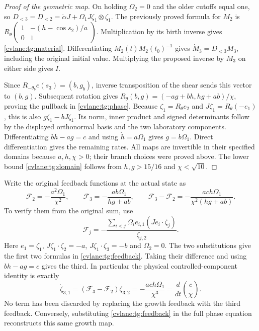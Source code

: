 \begin{proof}[Proof of the geometric map]
On holding $\Omega_2=0$ and the older cutoffs equal one, so
$D_{<3}=D_{<2}=\dot\alpha J+
\Omega_1J\zeta_1\otimes\zeta_1$.
The previously proved formula for $M_2$ is
$R_\theta\left(\begin{smallmatrix}1&-(h-\cos s_2)/a\\0&1\end{smallmatrix}\right)$.
Multiplication by its birth inverse gives \eqref{cvlane:tg:material}.
Differentiating $M_2(t)M_2(t_0)^{-1}$ gives
$\dot M_3=D_{<3}M_3$, including the original initial value.
Multiplying the proposed inverse by $M_3$ on either side gives $I$.

Since $R_{-\theta_b}e(s_3)=(b,g_b)$, inverse transposition
of the shear sends this vector to $(b,g)$. Subsequent rotation gives
$R_\theta(b,g)=(-ag+bh,hg+ab)/\chi$, proving the pullback in
\eqref{cvlane:tg:phase}. Because $\zeta_1=R_\theta e_2$ and
$J\zeta_1=R_\theta(-e_1)$, this is also
$g\zeta_1-bJ\zeta_1$. Its norm, inner product and signed
determinants follow by the displayed orthonormal basis and the two
laboratory components. Differentiating $bh-ag=c$ and using
$\dot h=a\Omega_1$ gives $\dot g=b\Omega_1$.
Direct differentiation gives the remaining rates.
All maps are invertible in their specified domains because
$a,h,\chi>0$; their branch choices were proved above.
The lower bound \eqref{cvlane:tg:domain} follows from
$h,g>15/16$ and $\chi<\sqrt{10}$.
\end{proof}

Write the original feedback functions at the actual state as
\begin{equation}\label{cvlane:tg:feedback}
 \mathcal F_2=-\frac{a^2\Omega_1}{\chi^2},\qquad
 \mathcal F_3=-\frac{ab\Omega_1}{hg+ab},\qquad
 \mathcal F_3-\mathcal F_2
    =-\frac{ach\Omega_1}{\chi^2(hg+ab)}.
\end{equation}
To verify them from the original sum, use
\[
 \mathcal F_j=-\frac{\sum_{i<j}\Omega_i e_{i,1}
                         (Je_i\cdot\zeta_j)}{\zeta_{j,2}}.
\]
Here $e_1=\zeta_1$, $J\zeta_1\cdot\zeta_2=-a$,
$J\zeta_1\cdot\zeta_3=-b$ and $\Omega_2=0$.
The two substitutions give the first two formulas in
\eqref{cvlane:tg:feedback}. Taking their difference and using $bh-ag=c$
gives the third. In particular the physical controlled-component
identity is exactly
\[
 \dot\zeta_{3,1}=(\mathcal F_3-\mathcal F_2)\zeta_{3,2}
             =-\frac{ach\Omega_1}{\chi^3}
             =\frac{d}{dt}\left(\frac c\chi\right).
\]
No term has been discarded by replacing the growth feedback with
the third feedback. Conversely, substituting \eqref{cvlane:tg:feedback}
in the full phase equation reconstructs this same growth map.

